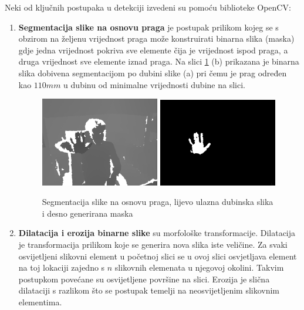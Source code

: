 \documentclass[times, utf8, diplomski, numeric]{fer}
\begin{document}
Neki od ključnih postupaka u detekciji izvedeni su pomoću biblioteke OpenCV:
\begin{enumerate}[label=$\bullet$]
	\item \textbf{Segmentacija slike na osnovu praga} je postupak prilikom kojeg se s obzirom na željenu vrijednost praga može konstruirati binarna slika (maska) gdje jedna vrijednost pokriva sve elemente čija je vrijednost ispod praga, a druga vrijednost sve elemente iznad praga. Na slici \ref{image_segmentation} (b) prikazana je binarna slika dobivena segmentacijom po dubini slike (a) pri čemu je prag određen kao $110mm$ u dubinu od minimalne vrijednosti dubine na slici.

\begin{figure}[h!]
\centering
\includegraphics[width = 0.49\textwidth]{detekcija/mask-image}
\includegraphics[width = 0.49\textwidth]{detekcija/mask-mask}
\caption{Segmentacija slike na osnovu praga, lijevo ulazna dubinska slika i desno generirana maska} \label{image_segmentation}
\end{figure}	

\item \textbf{Dilatacija i erozija binarne slike} su morfološke transformacije. Dilatacija je transformacija prilikom koje se generira nova slika iste veličine. Za svaki osvijetljeni slikovni element u početnoj slici se u ovoj slici osvjetljava element na toj lokaciji zajedno s $n$ slikovnih elemenata u njegovoj okolini. Takvim postupkom povećane su osvijetljene površine na slici. Erozija je slična dilataciji s razlikom što se postupak temelji na neosvijetljenim slikovnim elementima.


\end{enumerate}
\end{document}
